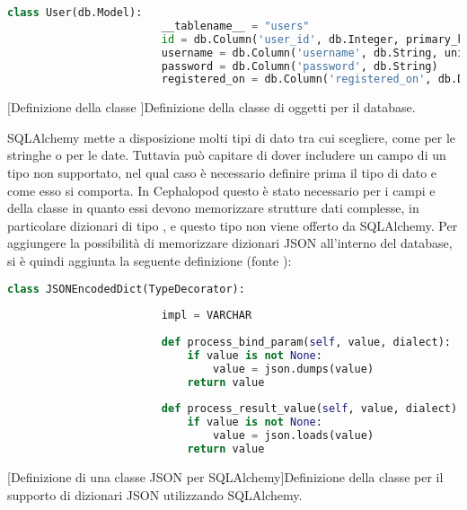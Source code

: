             \begin{center}
                \begin{lstlisting}[language=python, gobble=18]
                    class User(db.Model):
                        __tablename__ = "users"
                        id = db.Column('user_id', db.Integer, primary_key=True)
                        username = db.Column('username', db.String, unique=True, index=True)
                        password = db.Column('password', db.String)
                        registered_on = db.Column('registered_on', db.DateTime)
                \end{lstlisting}
                \captionsetup{textformat=empty,labelformat=empty} \vspace{-2em}
                [Definizione della classe ]{Definizione della classe di oggetti  per il database.}
            \end{center}
            
            SQLAlchemy mette a disposizione molti tipi di dato tra cui scegliere, come  per le stringhe o  per le date. Tuttavia può capitare di dover includere un campo di un tipo non supportato, nel qual caso è necessario definire prima il tipo di dato e come esso si comporta. In Cephalopod questo è stato necessario per i campi  e  della classe  in quanto essi devono memorizzare strutture dati complesse, in particolare dizionari di tipo , e questo tipo non viene offerto da SQLAlchemy. Per aggiungere la possibilità di memorizzare dizionari \ac{JSON} all'interno del database, si è quindi aggiunta la seguente definizione (fonte \cite{sqlalchemy:custom}):
            
            \begin{center}
                \begin{lstlisting}[language=python, gobble=18]
                    class JSONEncodedDict(TypeDecorator):
                    
                        impl = VARCHAR
                    
                        def process_bind_param(self, value, dialect):
                            if value is not None:
                                value = json.dumps(value)
                            return value
                    
                        def process_result_value(self, value, dialect):
                            if value is not None:
                                value = json.loads(value)
                            return value
                \end{lstlisting}
                \captionsetup{textformat=empty,labelformat=empty} \vspace{-2em}
                [Definizione di una classe JSON per SQLAlchemy]{Definizione della classe per il supporto di dizionari JSON utilizzando SQLAlchemy.}
            \end{center}
            
